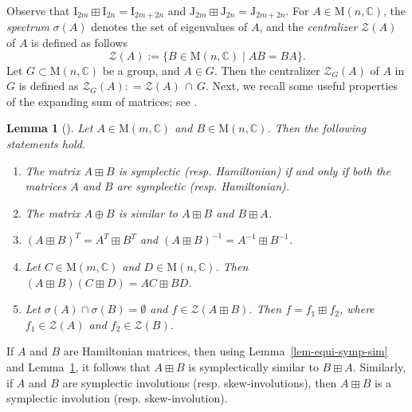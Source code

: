 \documentclass[11pt,reqno]{amsart}
\numberwithin{equation}{section}
\newtheorem{lemma}[theorem]{Lemma}
\theoremstyle{definition}
\def\C{\mathbb C}
\def\C{\mathbb {C}}
\newcommand{\lemref}[1]{Lemma~\ref{#1}}
\begin{document}
Observe that $\mathrm{I}_{2m}  \boxplus \mathrm{I}_{2n}  = \mathrm{I}_{2m +2n}$ and  $\mathrm{J}_{2m}   \boxplus \mathrm{J}_{2n} = \mathrm{J}_{2m +2n}$. For $A \in \mathrm{M}(n,\C)$, the  \textit{spectrum} $\sigma (A)$  denotes the set of eigenvalues of $A$, and the {\it centralizer} $\mathcal{Z}(A)$ of $A$  is defined as follows
\begin{equation}\label{eq-def-centralizer}
	\mathcal{Z}(A):= \{ B \in     \mathrm{M}(n,\C) \mid AB =BA   \}.
\end{equation}
Let $G\subset \mathrm{M}(n,\C) $ be a group, and $A\in G$. Then the centralizer $\mathcal{Z}_G(A)$ of $A$ in $G$ is defined as $\mathcal{Z}_G(A): =\mathcal{Z}(A)\, \cap\, G$.
Next, we recall some useful properties of the expanding sum of matrices; see  \cite{Cr, CP}. 
\begin{lemma}[{\cite[Lemma 4]{CP}}] \label{lem-prop-exp-sum}
	Let $A \in \mathrm{M}(m,\C)$ and  $B \in \mathrm{M}(n,\C)$.  Then the following statements hold.
	\begin{enumerate}
		\item The matrix $A \boxplus B$ is symplectic (resp. Hamiltonian)  if and only if both the matrices  $A$ and $B$ are symplectic (resp. Hamiltonian).
		\item The matrix $A \oplus B$ is similar to $A \boxplus B$ and $B \boxplus A$.
		
		\item $(A \boxplus B)^{T} = A^{T} \boxplus B^{T}$ and $(A \boxplus B)^{-1} = A^{-1} \boxplus B^{-1}$.
		
		\item Let $C \in \mathrm{M}(m,\C)$ and  $D \in \mathrm{M}(n,\C)$. Then $(A \boxplus B)(	C \boxplus D) = 	AC \boxplus BD$.
		\item Let $\sigma (A) \cap \sigma (B) = \emptyset$ and $f \in \mathcal{Z} (A \boxplus B)$. Then $f = f_{1} \boxplus f_{2}$, where $f_{1} \in \mathcal{Z} (A)$ and $f_{2} \in \mathcal{Z} (B)$.
	\end{enumerate}
\end{lemma}

If $A$ and $B$ are Hamiltonian matrices,  then using  \lemref{lem-equi-symp-sim} and \lemref{lem-prop-exp-sum}, it follows that $A \boxplus B$ is symplectically similar to  $B \boxplus A$. Similarly,
if $A$ and $B$ are symplectic involutions (resp. skew-involutions), then $A \boxplus B$ is a symplectic involution (resp. skew-involution).
\end{document}
